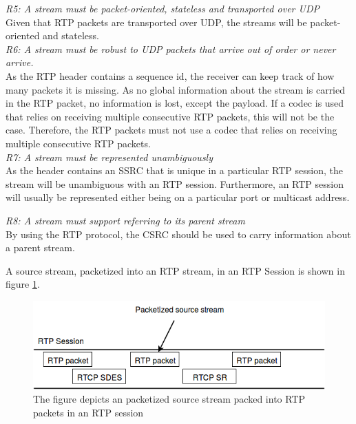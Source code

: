 \noindent\textit{R5: A stream must be packet-oriented, stateless and transported over UDP} \\
Given that RTP packets are transported over UDP, the streams will be packet-oriented and stateless.\\

\noindent\textit{R6: A stream must be robust to UDP packets that arrive out of order or never arrive.} \\
As the RTP header contains a sequence id, the receiver can keep track of how many packets it is missing. As no global information about the stream is carried in the RTP packet, no information is lost, except the payload. If a codec is used that relies on receiving multiple consecutive RTP packets, this will not be the case. Therefore, the RTP packets must not use a codec that relies on receiving multiple consecutive RTP packets. \\

\noindent\textit{R7: A stream must be represented unambiguously} \\
As the header contains an SSRC that is unique in a particular RTP session, the stream will be unambiguous with an RTP session. Furthermore, an RTP session will usually be represented either being on a particular port or multicast address.


\noindent\textit{R8: A stream must support referring to its parent stream} \\
By using the RTP protocol, the CSRC should be used to carry information about a parent stream.

A source stream, packetized into an RTP stream, in an RTP Session is shown in figure \ref{fig:design:stream}.

\begin{figure}[H]
	\centering
	\includegraphics[width=\textwidth]{figures/sourcestream-in-rtp}
	\caption{The figure depicts an packetized source stream packed into RTP packets in an RTP session}
	\label{fig:design:stream}
\end{figure}



